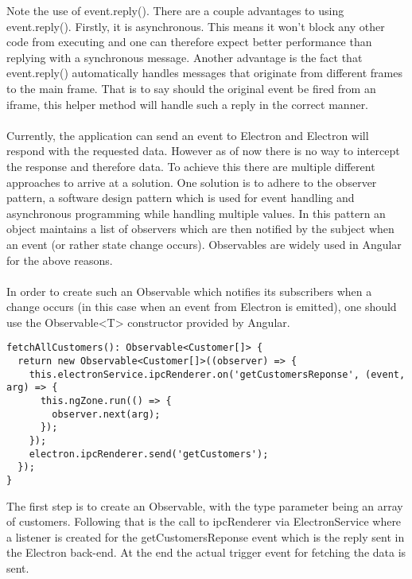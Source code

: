 Note the use of event.reply(). 
There are a couple advantages to using event.reply(). 
Firstly, it is asynchronous. 
This means it won't block any other code from executing and one can therefore expect better performance 
than replying with a synchronous message.
Another advantage is the fact that event.reply() automatically handles messages that originate from
different frames to the main frame. 
That is to say should the original event be fired from an iframe, this helper method will 
handle such a reply in the correct manner. \parencite{electronDocs}\paragraph{}
Currently, the application can send an event to Electron and Electron will respond with 
the requested data. 
However as of now there is no way to intercept the response and therefore data.
To achieve this there are multiple different approaches to arrive at a solution. 
One solution is to adhere to the observer pattern, a software design pattern which is used 
for event handling and asynchronous programming while handling multiple values.
In this pattern an object maintains a list of observers which are then notified by the 
subject when an event (or rather state change occurs).
Observables are widely used in Angular for the above reasons. \parencite{angularDocsObs}\paragraph{}
In order to create such an Observable which notifies its subscribers when a change occurs (in this 
case when an event from Electron is emitted), one should use the Observable<T> constructor provided
by Angular.
\begin{lstlisting}[caption=Creating an Observable for ipcRenderer]
fetchAllCustomers(): Observable<Customer[]> {
  return new Observable<Customer[]>((observer) => {
    this.electronService.ipcRenderer.on('getCustomersReponse', (event, arg) => {
      this.ngZone.run(() => {
        observer.next(arg);
      });
    });
    electron.ipcRenderer.send('getCustomers');
  });
}
\end{lstlisting}
The first step is to create an Observable, with the type parameter being an array of customers.
Following that is the call to ipcRenderer via ElectronService where a listener is created for 
the getCustomersReponse event which is the reply sent in the Electron back-end.
At the end the actual trigger event for fetching the data is sent. \paragraph{}
